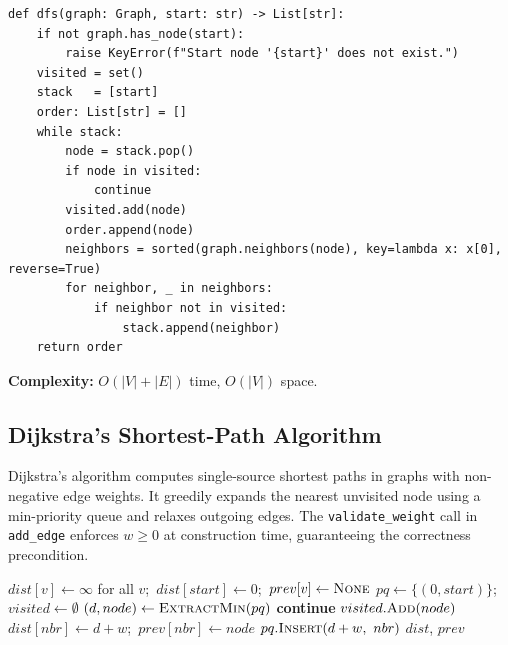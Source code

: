 \documentclass[12pt, a4paper]{article}
\begin{document}
\begin{lstlisting}[caption={DFS implementation (\texttt{src/algorithms/dfs.py}).}]
def dfs(graph: Graph, start: str) -> List[str]:
    if not graph.has_node(start):
        raise KeyError(f"Start node '{start}' does not exist.")
    visited = set()
    stack   = [start]
    order: List[str] = []
    while stack:
        node = stack.pop()
        if node in visited:
            continue
        visited.add(node)
        order.append(node)
        neighbors = sorted(graph.neighbors(node), key=lambda x: x[0], reverse=True)
        for neighbor, _ in neighbors:
            if neighbor not in visited:
                stack.append(neighbor)
    return order
\end{lstlisting}

\textbf{Complexity:} $O(|V|+|E|)$ time, $O(|V|)$ space.

\subsection{Dijkstra's Shortest-Path Algorithm}
\label{sec:dijkstra}

Dijkstra's algorithm computes single-source shortest paths in graphs with
non-negative edge weights. It greedily expands the nearest unvisited node
using a min-priority queue and relaxes outgoing edges. The
\texttt{validate\_weight} call in \texttt{add\_edge} enforces $w \geq 0$
at construction time, guaranteeing the correctness precondition.

\begin{algorithm}[H]
\caption{Dijkstra's Algorithm}
\begin{algorithmic}[1]
    \State $dist[v] \gets \infty$ for all $v$;\ $dist[start] \gets 0$;\ $prev[v] \gets \textsc{None}$
    \State $pq \gets \{(0, start)\}$;\ $visited \gets \emptyset$
        \State $(d, node) \gets \textsc{ExtractMin}(pq)$
         \textbf{continue} \EndIf
        \State $visited.\textsc{Add}(node)$
                \State $dist[nbr] \gets d + w$;\ $prev[nbr] \gets node$
                \State $pq.\textsc{Insert}(d+w,\ nbr)$
            \EndIf
        \EndFor
    \EndWhile
    \Return $dist$, $prev$
\EndFunction
\end{algorithmic}
\end{algorithm}
\end{document}
